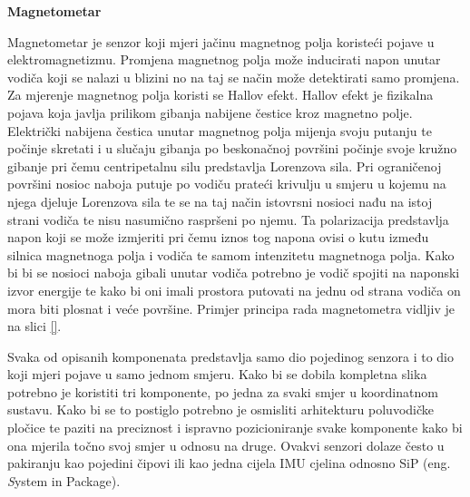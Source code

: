 \documentclass[times, utf8, diplomski]{fer}
\begin{document}
\textbf{Magnetometar}

Magnetometar je senzor koji mjeri jačinu magnetnog polja koristeći pojave u elektromagnetizmu. Promjena magnetnog polja može
inducirati napon unutar vodiča koji se nalazi u blizini no na taj se način može detektirati samo promjena. Za mjerenje magnetnog
polja koristi se Hallov efekt. Hallov efekt je fizikalna pojava koja javlja prilikom gibanja nabijene čestice kroz magnetno polje.
Električki nabijena čestica unutar magnetnog polja mijenja svoju putanju te počinje skretati i u slučaju gibanja po beskonačnoj
površini počinje svoje kružno gibanje pri čemu centripetalnu silu predstavlja Lorenzova sila. Pri ograničenoj površini nosioc
naboja putuje po vodiču prateći krivulju u smjeru u kojemu na njega djeluje Lorenzova sila te se na taj način istovrsni nosioci
nađu na istoj strani vodiča te nisu nasumično raspršeni po njemu. Ta polarizacija predstavlja napon koji se može izmjeriti pri
čemu iznos tog napona ovisi o kutu između silnica magnetnoga polja i vodiča te samom intenzitetu magnetnoga polja. Kako bi bi se 
nosioci naboja gibali unutar vodiča potrebno je vodič spojiti na naponski izvor energije te kako bi oni imali prostora putovati na 
jednu od strana vodiča on mora biti plosnat i veće površine. Primjer principa rada magnetometra vidljiv je na slici \ref{}.


Svaka od opisanih komponenata predstavlja samo dio pojedinog senzora i to dio koji mjeri pojave u samo jednom smjeru. Kako bi se
dobila kompletna slika potrebno je koristiti tri komponente, po jedna za svaki smjer u koordinatnom sustavu. Kako bi se to postiglo
potrebno je osmisliti arhitekturu poluvodičke pločice te paziti na preciznost i ispravno pozicioniranje svake komponente kako bi
ona mjerila točno svoj smjer u odnosu na druge. Ovakvi senzori dolaze često u pakiranju kao pojedini čipovi ili kao jedna cijela
IMU cjelina odnosno SiP (eng. \textit System in Package).
\end{document}
